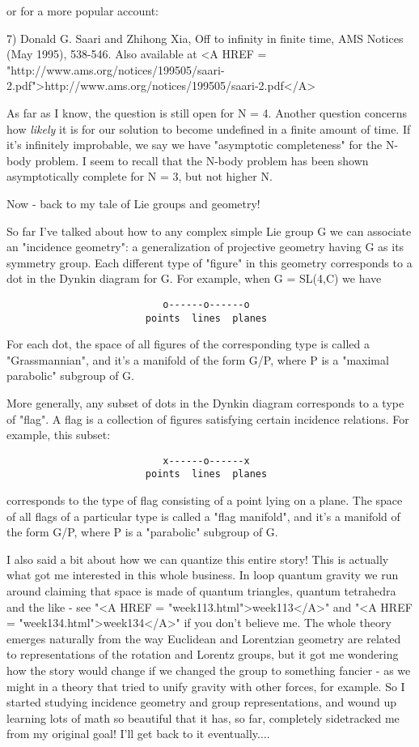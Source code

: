 or for a more popular account:

7) Donald G. Saari and Zhihong Xia, Off to infinity in finite time,
AMS Notices (May 1995), 538-546.  Also available at
<A HREF = "http://www.ams.org/notices/199505/saari-2.pdf">http://www.ams.org/notices/199505/saari-2.pdf</A>

As far as I know, the question is still open for N = 4.  Another
question concerns how \emph{likely} it is for our solution to become
undefined in a finite amount of time.  If it's infinitely improbable, we
say we have "asymptotic completeness" for the N-body problem.  I seem to
recall that the N-body problem has been shown asymptotically complete
for N = 3, but not higher N.  

Now - back to my tale of Lie groups and geometry!

So far I've talked about how to any complex simple Lie group G we can
associate an "incidence geometry": a generalization of projective
geometry having G as its symmetry group.  Each different type of
"figure" in this geometry corresponds to a dot in the Dynkin diagram
for G.  For example, when G = SL(4,C) we have

\begin{verbatim}
                           o------o------o
                        points  lines  planes       
\end{verbatim}
    
For each dot, the space of all figures of the corresponding type is
called a "Grassmannian", and it's a manifold of the form G/P, where P 
is a "maximal parabolic" subgroup of G.

More generally, any subset of dots in the Dynkin diagram corresponds to
a type of "flag".  A flag is a collection of figures satisfying certain
incidence relations.   For example, this subset:

\begin{verbatim}
                           x------o------x
                        points  lines  planes       
\end{verbatim}
    
corresponds to the type of flag consisting of a point lying on a plane.
The space of all flags of a particular type is called a "flag
manifold", and it's a manifold of the form G/P, where P is a
"parabolic" subgroup of G.

I also said a bit about how we can quantize this entire story!  This is
actually what got me interested in this whole business.  In loop quantum
gravity we run around claiming that space is made of quantum triangles,
quantum tetrahedra and the like - see "<A HREF = "week113.html">week113</A>" and "<A HREF = "week134.html">week134</A>" if you
don't believe me.  The whole theory emerges naturally from the way
Euclidean and Lorentzian geometry are related to representations of the
rotation and Lorentz groups, but it got me wondering how the story
would change if we changed the group to something fancier - as we might
in a theory that tried to unify gravity with other forces, for example.
So I started studying incidence geometry and group representations, and 
wound up learning lots of math so beautiful that it has, so far, completely
sidetracked me from my original goal!  I'll get back to it eventually....

